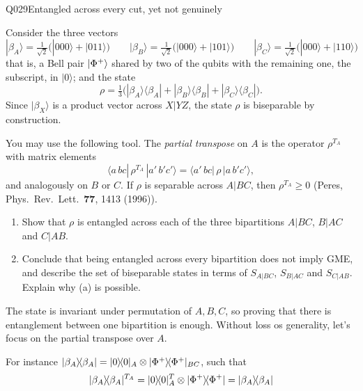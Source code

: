\begin{entry}{Q029}{Entangled across every cut, yet not genuinely}
\begin{problem}
Consider the three vectors
\begin{equation}\label{eq:q029-pairs}
  |\beta_A\rangle = \tfrac{1}{\sqrt2}\big(|000\rangle + |011\rangle\big)
  \qquad
  |\beta_B\rangle = \tfrac{1}{\sqrt2}\big(|000\rangle + |101\rangle\big)
  \qquad
  |\beta_C\rangle = \tfrac{1}{\sqrt2}\big(|000\rangle + |110\rangle\big)
\end{equation}
that is, a Bell pair $\lvert \Phi^+ \rangle$ shared by two of the qubits with the remaining one, the
subscript, in $|0\rangle$; and the state
\begin{equation}\label{eq:q029-rho}
  \rho = \tfrac13\big(|\beta_A\rangle\langle\beta_A|
         + |\beta_B\rangle\langle\beta_B|
         + |\beta_C\rangle\langle\beta_C|\big).
\end{equation}
Since $|\beta_X\rangle$ is a product vector across $X|YZ$, the state $\rho$
is biseparable by construction.

You may use the following tool. The \emph{partial transpose} on $A$ is the
operator $\rho^{T_A}$ with matrix elements
\begin{equation}\label{eq:q029-pt}
  \langle a\,bc|\,\rho^{T_A}\,|a'\,b'c'\rangle
  = \langle a'\,bc|\,\rho\,|a\,b'c'\rangle ,
\end{equation}
and analogously on $B$ or $C$. If $\rho$ is separable across $A|BC$, then
$\rho^{T_A} \geq 0$ (Peres, Phys.\ Rev.\ Lett.\ \textbf{77}, 1413 (1996)).

\begin{enumerate}
  \item[(a)] Show that $\rho$ is entangled across each of the three
  bipartitions $A|BC$, $B|AC$ and $C|AB$.

  \item[(b)] Conclude that being entangled across every bipartition does not
  imply GME, and describe the set of biseparable states in terms of
  $S_{A|BC}$, $S_{B|AC}$ and $S_{C|AB}$. Explain why (a) is possible.
\end{enumerate}
\end{problem}

\begin{solution}[a]
The state is invariant under permutation of $A, B, C$, so proving that there is entanglement between one bipartition is enough. Without loss os generality, let's focus on the partial transpose over $A$.

For instance $\lvert \beta_A \rangle\!\langle \beta_A \rvert=\lvert 0 \rangle\!\langle 0 \rvert_A \otimes \lvert \Phi^+ \rangle\!\langle \Phi^+ \rvert_{BC}$, such that 
$$\lvert \beta_A \rangle\!\langle \beta_A \rvert^{T_A}=\lvert 0 \rangle\!\langle 0 \rvert_A^T \otimes \lvert \Phi^+ \rangle\!\langle \Phi^+ \rvert=\lvert \beta_A \rangle\!\langle \beta_A \rvert$$


\end{solution}
\end{entry}
